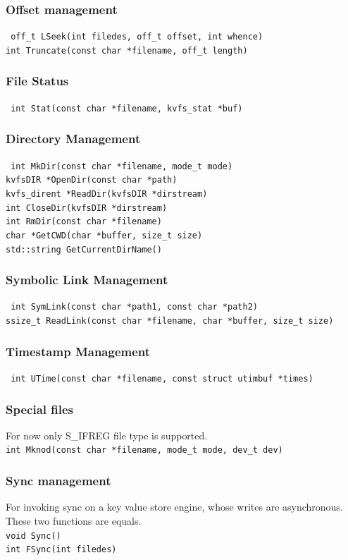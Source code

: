 \documentclass[bsc,frontabs,twoside,singlespacing,parskip,deptreport]{infthesis}     %
\begin{document}
{\subsubsection{Offset management}
{\tt
	off\_t LSeek(int filedes, off\_t offset, int whence)
	\\
	int Truncate(const char *filename, off\_t length)
}
\subsubsection{File Status}
{\tt
	int Stat(const char *filename, kvfs\_stat *buf)
}
\subsubsection{Directory Management}
{\tt 
	int MkDir(const char *filename, mode\_t mode)
\\
	kvfsDIR *OpenDir(const char *path)
\\
	kvfs\_dirent *ReadDir(kvfsDIR *dirstream)
	\\
	int CloseDir(kvfsDIR *dirstream)
\\	
	int RmDir(const char *filename)
\\
	char *GetCWD(char *buffer, size\_t size)
	\\
	std::string GetCurrentDirName()
}
\subsubsection{Symbolic Link Management}
{\tt
	int SymLink(const char *path1, const char *path2)
	\\
	ssize\_t ReadLink(const char *filename, char *buffer, size\_t size)
}
\subsubsection{Timestamp Management}
{\tt
	int UTime(const char *filename, const struct utimbuf *times)
}
\subsubsection{Special files}
For now only S\_IFREG file type is supported.\\
{\tt int Mknod(const char *filename, mode\_t mode, dev\_t dev)}
\subsubsection{Sync management}
For invoking sync on a key value store engine, whose writes are asynchronous. These two functions are equals.
{\tt
\\
	void Sync()
	\\
	 int FSync(int filedes)
}
}
\end{document}
